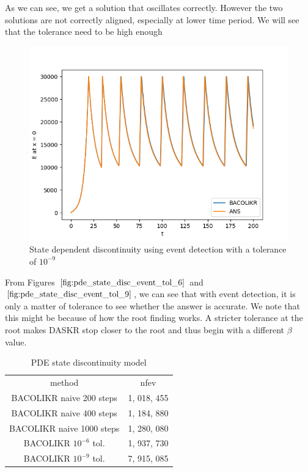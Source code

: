 \documentclass{article}
\begin{document}
As we can see, we get a solution that oscillates correctly. However the two solutions are not correctly aligned, especially at lower time period. We will see that the tolerance need to be high enough

\begin{figure}[H]
\centering
\includegraphics[width=0.7\linewidth]{./figures/pde_state_disc_event_tol_9}
\caption{State dependent discontinuity using event detection with a tolerance of $10^{-9}$}
\label{fig:pde_state_disc_event_tol_9}
\end{figure}

From Figures $\ref{fig:pde_state_disc_event_tol_6}$ and $\ref{fig:pde_state_disc_event_tol_9}$, we can see that with event detection, it is only a matter of tolerance to see whether the answer is accurate. We note that this might be because of how the root finding works. A stricter tolerance at the root makes DASKR stop closer to the root and thus begin with a different $\beta$ value.

\begin{table}[h]
\caption {PDE state discontinuity model} 
\label{tab:pde_state_nfev}
\begin{center}
\begin{tabular}{ c c } 
method                    & nfev \\ 
BACOLIKR naive 200 steps  & 1, 018, 455    \\
BACOLIKR naive 400 steps  & 1, 184, 880    \\
BACOLIKR naive 1000 steps & 1, 280, 080    \\
BACOLIKR $10^{-6}$ tol.   & 1, 937, 730    \\
BACOLIKR $10^{-9}$ tol.   & 7, 915, 085    \\
\end{tabular}
\end{center}
\end{table}
\end{document}
